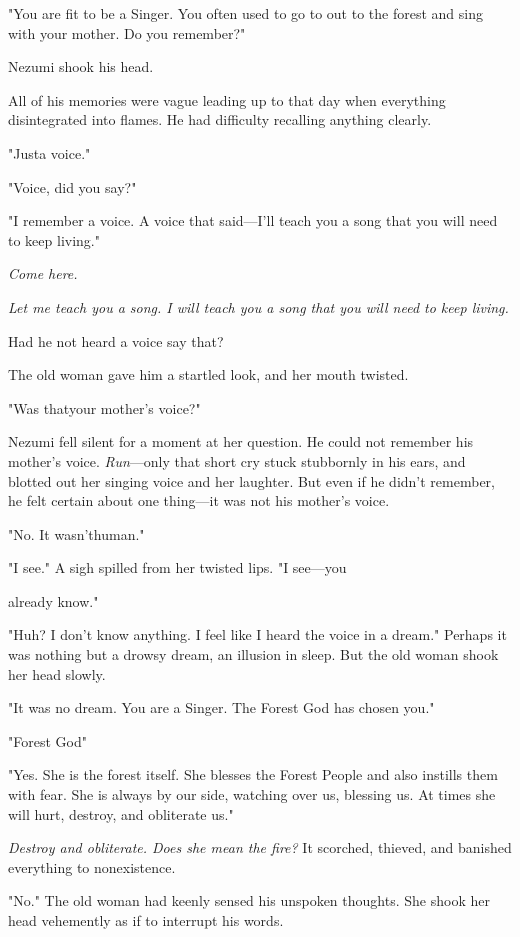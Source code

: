 "You are fit to be a Singer. You often used to go to out to the forest
and sing with your mother. Do you remember?"

Nezumi shook his head.

All of his memories were vague leading up to that day when everything
disintegrated into flames. He had difficulty recalling anything clearly.

"Just\el a voice."

"Voice, did you say?"

"I remember a voice. A voice that said---I'll teach you a song that you
will need to keep living."

\emph{Come here.}

\emph{Let me teach you a song. I will teach you a song that you will need to
keep living.}

Had he not heard a voice say that?

The old woman gave him a startled look, and her mouth twisted.

"Was that\el your mother's voice?"

Nezumi fell silent for a moment at her question. He could not remember
his mother's voice. \emph{Run}---only that short cry stuck stubbornly in his
ears, and blotted out her singing voice and her laughter. But even if he
didn't remember, he felt certain about one thing---it was not his mother's
voice.

"No. It wasn't\el human."

"\el I see." A sigh spilled from her twisted lips. "I see---you~

already know."

"Huh? I don't know anything. I feel like I heard the voice in a dream."
Perhaps it was nothing but a drowsy dream, an illusion in sleep. But the
old woman shook her head slowly.

"It was no dream. You are a Singer. The Forest God has chosen you."

"Forest God\el "

"Yes. She is the forest itself. She blesses the Forest People and also
instills them with fear. She is always by our side, watching over us,
blessing us. At times she will hurt, destroy, and obliterate us."

\emph{Destroy and obliterate. Does she mean the fire?} It scorched, thieved,
and banished everything to nonexistence.

"No." The old woman had keenly sensed his unspoken thoughts. She shook
her head vehemently as if to interrupt his words.

